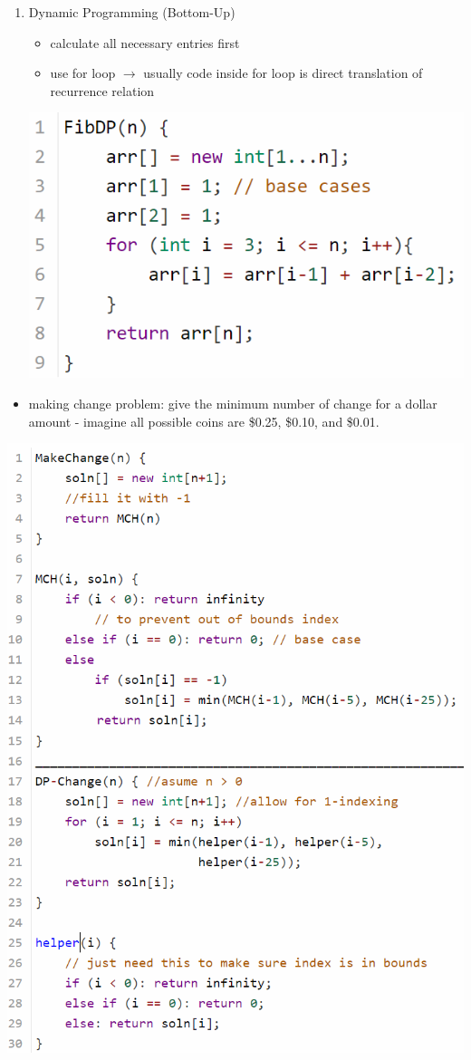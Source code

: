 \begin{enumerate}
    \item Dynamic Programming (Bottom-Up)
        \begin{itemize}[leftmargin = 1em]
            \item calculate all necessary entries first
            \item use for loop $\rightarrow$ usually code inside for loop is direct translation of recurrence relation
        \end{itemize}
    \includegraphics[scale = 0.6]{pictures/fibonacci dp.png}
\end{enumerate}
\begin{itemize}
    \item making change problem: give the minimum number of change for a dollar amount - imagine all possible coins are \$0.25, \$0.10, and \$0.01. 
\end{itemize} 
\includegraphics[scale = 0.7]{pictures/Change code.png} 
